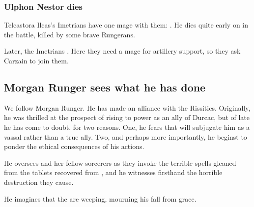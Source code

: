 \subsubsection{Ulphon Nestor dies}
Telcastora Ilcas's Imetrians have one mage with them: 
. 
He dies quite early on in the battle, killed by some brave Rungerans. 

Later, the Imetrians .
Here they need a mage for artillery support, so they ask Carzain to join them. 









\subsection{Morgan Runger sees what he has done}
We follow Morgan Runger. He has made an alliance with the Rissitics. Originally, he was thrilled at the prospect of rising to power as an ally of Durcac, but of late he has come to doubt, for two reasons. One, he fears that \Nechsain{} will subjugate him as a vassal rather than a true ally. Two, and perhaps more importantly, he beginst to ponder the ethical consequences of his actions. 

He oversees \Takestsha{} and her fellow sorcerers as they invoke the terrible spells gleaned from the tablets recovered from \Rungertemple, and he witnesses firsthand the horrible destruction they cause. 

He imagines that the \sephiroth{} are weeping, mourning his fall from grace.


